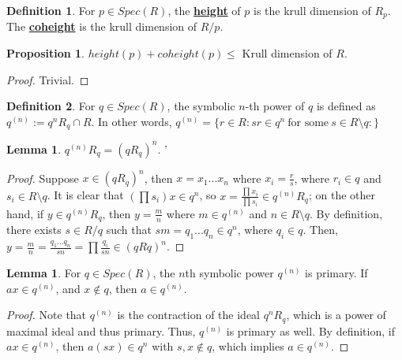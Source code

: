 \documentclass{article}
\theoremstyle{definition}
\theoremstyle{definition}
\theoremstyle{definition}
\newtheorem{proposition}{Proposition}[section]
\theoremstyle{definition}
\newtheorem{lemma}[theorem]{Lemma}
\theoremstyle{definition}
\newtheorem{definition}{Definition}[section]
\theoremstyle{definition}
\theoremstyle{definition}
\begin{document}
\begin{tcolorbox}[colback=purple!5!white,colframe=purple!75!black]
\begin{definition}
    For $p\in Spec(R)$, the \underline{\textbf{height}} of $p$ is the krull dimension of $R_{p}$. The \underline{\textbf{coheight}} is the krull dimension of $R/p$. 
\end{definition}
\end{tcolorbox}


\begin{tcolorbox}[colback=blue!5!white,colframe=blue!30!white]
\begin{proposition}
$height(p)+coheight(p)\leq$ Krull dimension of $R$.
\end{proposition}
\end{tcolorbox}
\begin{proof}
    Trivial. 
\end{proof}


\begin{tcolorbox}[colback=purple!5!white,colframe=purple!75!black]
\begin{definition}
    For $q\in Spec(R)$, the symbolic $n$-th power of $q$ is defined as $q^{(n)}:=q^nR_{q}\cap R$. In other words, $q^{(n)}=\{ r\in R: sr\in q^n \ \textrm{for some} \ s\in R\setminus q : \}$
\end{definition}
\end{tcolorbox}

\begin{tcolorbox}
    \begin{lemma}
    $q^{(n)}R_q=(qR_q)^{n}$. '

    \end{lemma}
    \end{tcolorbox}
    \begin{proof}
        Suppose $x\in (qR_q)^{n}$, then $x=x_1...x_n$ where $x_i=\frac{r}{s}$, where $r_i\in q$ and $s_i\in R\setminus q$. It is clear that $(\prod s_i)x\in q^n$, so  
        $x=\frac{\prod x_i}{\prod s_i}\in q^{(n)}R_q$; on the other hand, if $y\in q^{(n)}R_q$, then $y=\frac{m}{n}$ where $m\in q^{(n)}$ and $n\in R\setminus q$. By definition, there exists $s\in R/q$ such that $sm= q_1...q_n\in q^n$, where $q_i\in q$. Then, $y=\frac{m}{n}=\frac{q_1...q_n}{sn}=\prod \frac{q_i}{sn}\in (qRq)^n$.
    \end{proof}
    
    
    \begin{tcolorbox}
    \begin{lemma}
     For $q\in Spec(R)$, the $n$th symbolic power $q^{(n)}$ is primary. If $ax\in q^{(n)}$, and $x\not \in q$, then $a\in q ^{(n)}$. 
    \end{lemma}
    \end{tcolorbox}
    \begin{proof}
        Note that $q^{(n)}$ is the contraction of the ideal $q^nR_q$, which is a power of maximal ideal and thus primary. Thus, $q^{(n)}$ is primary as well. By definition, if $ax\in q^{(n)}$, then $a(sx)\in q^n$ with $s,x\not \in q$, which implies $a\in  q^{(n)}$.
    \end{proof}
\end{document}

